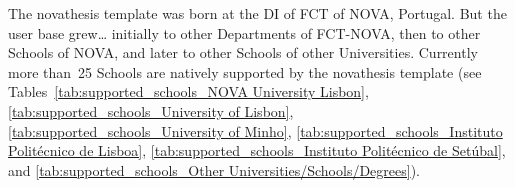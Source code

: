 The \gls{novathesis} template was born at the \gls{DI} of  \gls{FCT} of \gls{NOVA}, Portugal.  But the user base grew… initially to other Departments of FCT-NOVA, then to other Schools of NOVA, and later to other Schools of other Universities.  Currently more than~25 Schools are natively supported by the \gls{novathesis} template (see Tables~\ref{tab:supported_schools_NOVA University Lisbon}, \ref{tab:supported_schools_University of Lisbon}, \ref{tab:supported_schools_University of Minho}, \ref{tab:supported_schools_Instituto Politécnico de Lisboa}, \ref{tab:supported_schools_Instituto Politécnico de Setúbal}, and \ref{tab:supported_schools_Other Universities/Schools/Degrees}).

\newcommand{\docCover}[1]{\setlength{\fboxsep}{0pt}\fbox{\colorbox{White}{\texttt{[image: \#1]}}}}
\newcommand{\schlName}[3]{\textbf{#1} (\href{#3}{#2})}
\newcommand{\degreeName}[3]{\\\null\quad • #1 \href{#3}{(#2)}}

